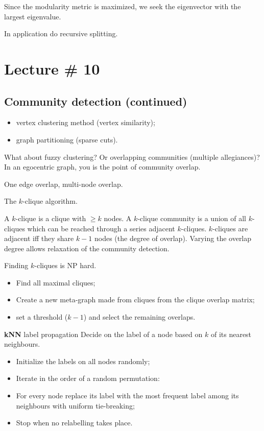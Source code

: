 \documentclass[a4paper]{article}
\begin{document}
Since the modularity metric is maximized, we seek the eigenvector with the largest eigenvalue.


In application do recursive splitting.



\section{Lecture \# 10} %
\label{sec:lecture_10}
\subsection{Community detection (continued)} %
\label{sub:community_detection_continued}

\begin{itemize}
	\item vertex clustering method (vertex similarity);
	\item graph partitioning (sparse cuts).
\end{itemize}

What about fuzzy clustering? Or overlapping communities (multiple allegiances)? In an egocentric graph, you is the point of community overlap.

One edge overlap, multi-node overlap.

The $k$-clique algorithm.

A $k$-clique is a clique with $\geq k$ nodes. A $k$-clique community is a union of all $k$-cliques which can be reached through a series adjacent $k$-cliques. $k$-cliques are adjacent iff they share $k-1$ nodes (the degree of overlap). Varying the overlap degree allows relaxation of the community detection.

Finding $k$-cliques is NP hard.
\begin{itemize}
	\item Find all maximal cliques;
	\item Create a new meta-graph made from cliques from the clique overlap matrix;
	\item set a threshold ($k-1$) and select the remaining overlaps.
\end{itemize}

\textbf{kNN} label propagation
Decide on the label of a node based on $k$ of its nearest neighbours.
\begin{itemize}
	\item Initialize the labels on all nodes randomly;
	\item Iterate in the order of a random permutation:
	\item For every node replace its label with the most frequent label among its neighbours with uniform tie-breaking;
	\item Stop when no relabelling takes place.
\end{itemize}
\end{document}
